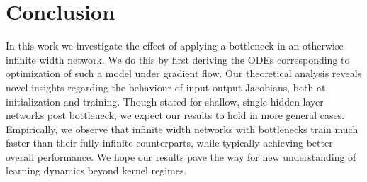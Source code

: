 \documentclass{article}
\theoremstyle{definition}
\theoremstyle{remark}
\renewcommand{\[}{\begin{eqnarray}}
\renewcommand{\]}{\end{eqnarray}}
\renewcommand{\[}{\begin{eqnarray}}
\renewcommand{\]}{\end{eqnarray}}
\begin{document}

\section{Conclusion}
In this work we investigate the effect of applying a bottleneck in an otherwise infinite width network. We do this by first deriving the ODEs corresponding to optimization of such a model under gradient flow. Our theoretical analysis reveals novel insights regarding the behaviour of input-output Jacobians, both at initialization and training. Though stated for shallow, single hidden layer networks post bottleneck, we expect our results to hold in more general cases. Empirically, we observe that infinite width networks with bottlenecks train much faster than their fully infinite counterparts, while typically achieving better overall performance. We hope our results pave the way for new understanding of learning dynamics beyond kernel regimes.




\newpage
\appendix
\onecolumn
\end{document}
